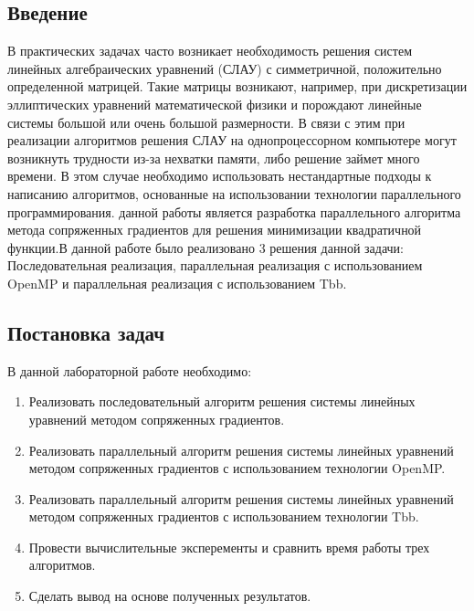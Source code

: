 \documentclass{report}
\begin{document}
\setcounter{page}{2}
\tableofcontents{}
\clearpage

\begin{center}
\section*{Введение}
\end{center}
\par В практических задачах часто возникает необходимость решения систем линейных алгебраических уравнений (СЛАУ) с симметричной, положительно определенной матрицей. Такие матрицы возникают, например, при дискретизации эллиптических уравнений математической физики и порождают линейные системы большой или очень большой размерности. В связи с этим при реализации алгоритмов решения СЛАУ на однопроцессорном компьютере могут возникнуть трудности из-за нехватки памяти, либо решение займет много времени. В этом случае необходимо использовать нестандартные подходы к написанию алгоритмов, основанные на использовании технологии параллельного программирования.
 данной работы является разработка параллельного алгоритма метода сопряженных градиентов для решения минимизации квадратичной функции.В данной работе было реализовано 3 решения данной задачи: Последовательная реализация, параллельная реализация с использованием OpenMP и параллельная реализация с использованием Tbb.
\newpage

\begin{center}
\section*{Постановка задач}
\end{center}
В данной лабораторной работе необходимо:
\begin{enumerate}
\item Реализовать последовательный алгоритм решения системы линейных уравнений методом сопряженных градиентов.
\item Реализовать параллельный алгоритм решения системы линейных уравнений методом сопряженных градиентов с использованием технологии OpenMP.
\item Реализовать параллельный алгоритм решения системы линейных уравнений методом сопряженных градиентов с использованием технологии Tbb.
\item Провести вычислительные эксперементы и сравнить время работы трех алгоритмов.
\item Сделать вывод на основе полученных результатов.
\end{enumerate}
\newpage
\end{document}

